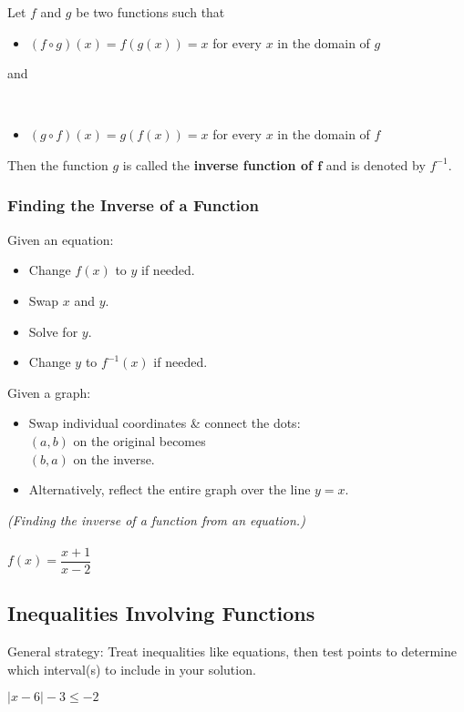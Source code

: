 \newpage

\begin{definition}
    Let $f$ and $g$ be two functions such that\\
    \begin{itemize}
        \item $(f\circ g)(x)=f(g(x))=x$ for every $x$ in the domain of $g$
    \end{itemize}
    \begin{center}and\end{center}\\
    \begin{itemize}
        \item $(g\circ f)(x)=g(f(x))=x$ for every $x$ in the domain of $f$
    \end{itemize}
Then the function $g$ is called the \textbf{inverse function of $\mathbf{f}$} and is denoted by $f^{-1}$.
    \end{definition}

\subsubsection{Finding the Inverse of a Function}

\begin{multicols}{2}
Given an equation:\\
\begin{itemize}
    \item Change $f(x)$ to $y$ if needed.
    \item Swap $x$ and $y$.
    \item Solve for $y$.
    \item Change $y$ to $f^{-1}(x)$ if needed.
\end{itemize}
\columnbreak
Given a graph:\\
\begin{itemize}
    \item Swap individual coordinates \& connect the dots:\\
          $(a,b)$ on the original becomes\\
          $(b,a)$ on the inverse.
    \item Alternatively, reflect the entire graph over the line $y=x$.
\end{itemize}
\end{multicols}

\begin{example}
    \textit{(Finding the inverse of a function from an equation.)} \\\\$f(x)=\dfrac{x+1}{x-2}$
\end{example}

\newpage

\subsection{Inequalities Involving Functions}
General strategy: Treat inequalities like equations, then test points to determine which interval(s) to include in your solution.
\begin{example}
    $|x-6|-3\leq-2$
\end{example}